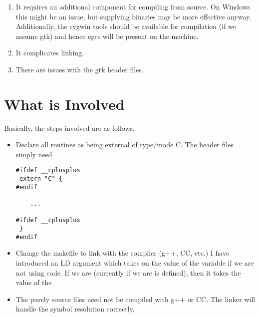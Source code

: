 \documentclass{article}
\def\MakeVariable#1{\Escape{#1}}
\begin{document}
\begin{enumerate}
\item It requires an additional component for compiling from
source. On Windows this might be an issue, but supplying binaries may
be more effective anyway. Additionally, the cygwin tools should be
available for compilation (if we assume gtk) and hence egcs will be
present on the machine.

\item It complicates linking.

\item There are issues with the gtk header files.

\end{enumerate}


\section{What is Involved}
Basically, the steps involved are as follows.
\begin{itemize}
\item Declare all routines as being external
of type/mode C.
The header files simply need 

\begin{verbatim}
#ifdef __cplusplus
 extern "C" {
#endif

    ...

#ifdef __cplusplus
 }
#endif
\end{verbatim}
\item Change the makefile to link with the \Cplus{} compiler (g++, CC,
etc.)  I have introduced an LD argument which takes on the value of
the variable \MakeVariable{CC} if we are not using \Cplus{} code.  If
we are (currently if we are \MakeVariable{USE_MySQL} is defined), then
it takes the value of the \MakeVariable{CXX}
\item The purely \C{} source files need not be compiled with g++ or
CC. The linker will handle the symbol resolution correctly.
\end{itemize}
\end{document}
